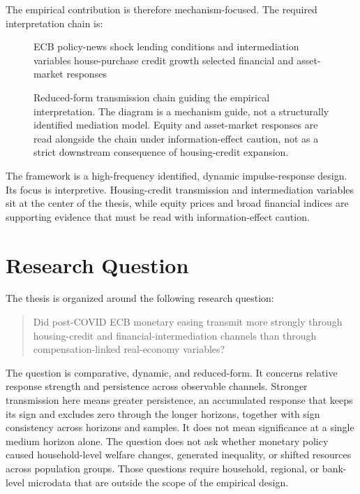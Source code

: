 The empirical contribution is therefore mechanism-focused. The required interpretation chain is:

\begin{figure}[htbp]
  \centering
  \caption{Reduced-form transmission chain guiding the empirical interpretation. The diagram is a mechanism guide, not a structurally identified mediation model. Equity and asset-market responses are read alongside the chain under information-effect caution, not as a strict downstream consequence of housing-credit expansion.}
  \label{fig:conceptual-intermediation-chain}
  \thesismechanismchain
    {ECB policy-news shock}
    {lending conditions and intermediation variables}
    {house-purchase credit growth}
    {selected financial and asset-market responses}
\end{figure}

\noindent The framework is a high-frequency identified, dynamic impulse-response design. Its focus is interpretive. Housing-credit transmission and intermediation variables sit at the center of the thesis, while equity prices and broad financial indices are supporting evidence that must be read with information-effect caution.

\section{Research Question}

The thesis is organized around the following research question:

\begin{quote}
Did post-COVID ECB monetary easing transmit more strongly through housing-credit and financial-intermediation channels than through compensation-linked real-economy variables?
\end{quote}

The question is comparative, dynamic, and reduced-form. It concerns relative response strength and persistence across observable channels. Stronger transmission here means greater persistence, an accumulated response that keeps its sign and excludes zero through the longer horizons, together with sign consistency across horizons and samples. It does not mean significance at a single medium horizon alone. The question does not ask whether monetary policy caused household-level welfare changes, generated inequality, or shifted resources across population groups. Those questions require household, regional, or bank-level microdata that are outside the scope of the empirical design.

